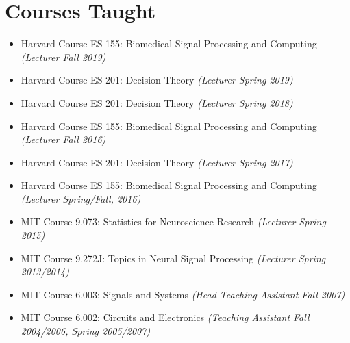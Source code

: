 \section*{Courses Taught}

  \begin{itemize}
  	  \item Harvard Course ES 155: Biomedical Signal Processing and Computing \emph{(Lecturer Fall 2019)}
  	  \item Harvard Course ES 201: Decision Theory \emph{(Lecturer Spring 2019)}
    	  \item Harvard Course ES 201: Decision Theory \emph{(Lecturer Spring 2018)}
   	  \item Harvard Course ES 155: Biomedical Signal Processing and Computing \emph{(Lecturer Fall 2016)}
  	  \item Harvard Course ES 201: Decision Theory \emph{(Lecturer Spring 2017)}
   	  \item Harvard Course ES 155: Biomedical Signal Processing and Computing \emph{(Lecturer Spring/Fall, 2016)}
      \item MIT Course 9.073: Statistics for Neuroscience Research \emph{(Lecturer Spring 2015)}
      \item MIT Course 9.272J: Topics in Neural Signal Processing \emph{(Lecturer Spring 2013/2014)}
      \item MIT Course 6.003: Signals and Systems \emph{(Head Teaching Assistant Fall 2007)}
      \item MIT Course 6.002: Circuits and Electronics \emph{(Teaching Assistant Fall 2004/2006, Spring 2005/2007)}
  \end{itemize}
